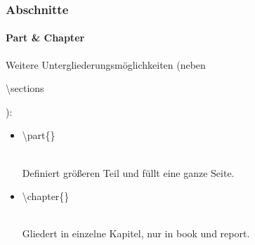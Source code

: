 
\begin{frame}
\frametitle{Abschnitte}
\framesubtitle{Part \& Chapter}

Weitere Untergliederungsmöglichkeiten (neben \begin{ttfamily}\color{unibablueI}\textbackslash section\color{black}s\end{ttfamily}):
\begin{itemize}
\item  \begin{ttfamily}\color{unibablueI}\textbackslash part\color{black}\{\}\end{ttfamily}\\
Definiert größeren Teil und füllt eine ganze Seite.
\item \begin{ttfamily}\color{unibablueI}\textbackslash chapter\color{black}\{\}\end{ttfamily}\\
Gliedert in einzelne Kapitel, nur in {\ttfamily book} und {\ttfamily report}.
\end{itemize}


\end{frame}


